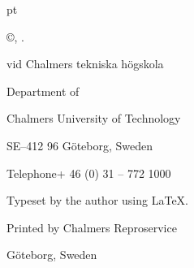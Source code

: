 \vspace*{50 pt}
{
  \thispagestyle{empty}         %

   pt

  \thesistitle

  \thesissubtitle

  \textsc{\thesisauthor}

  \thesisisbn

  \vskip 1pc

  \copyright\enskip \textsc{\thesisauthor, \thesisyear.}

  \vskip 1pc

   vid Chalmers tekniska högskola


  \thesisissn

  \vskip 1pc

  Department of \thesisdepartment

  Chalmers University of Technology

  SE--412 96 Göteborg, Sweden

  Telephone\enskip+ 46 (0) 31 -- 772 1000

  \vfill

  \thesiscoverdescription

  \vskip 2pc

  Typeset by the author using \LaTeX.

  \vskip 1pc

  Printed by Chalmers Reproservice

  Göteborg, Sweden \thesisyear
}

\clearpage
